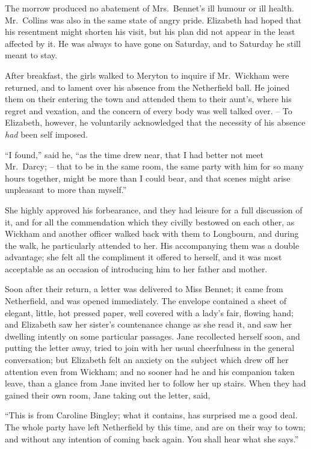 The morrow produced no abatement of Mrs.\ Bennet’s
ill humour or ill health. Mr.\ Collins was also in the
same state of angry pride. Elizabeth had hoped that his
resentment might shorten his visit, but his plan did not
appear in the least affected by it. He was always to have
gone on Saturday, and to Saturday he still meant to stay.

After breakfast, the girls walked to Meryton to inquire
if Mr.\ Wickham were returned, and to lament over his
absence from the Netherfield ball. He joined them on
their entering the town and attended them to their aunt’s,
where his regret and vexation, and the concern of every
body was well talked over. -- To Elizabeth, however, he
voluntarily acknowledged that the necessity of his absence
\textit{had} been self imposed.

“I found,” said he, “as the time drew near, that I had
better not meet Mr.\ Darcy; -- that to be in the same
room, the same party with him for so many hours together,
might be more than I could bear, and that scenes might
arise unpleasant to more than myself.”

She highly approved his forbearance, and they had
leis\-ure for a full discussion of it, and for all the
commendation which they civilly bestowed on each other,
as Wickham and another officer walked back with them
to Longbourn, and during the walk, he particularly
attended to her. His accompanying them was a double
advantage; she felt all the compliment it offered to
herself, and it was most acceptable as an occasion of
introducing him to her father and mother.

Soon after their return, a letter was delivered to Miss
Bennet; it came from Netherfield, and was opened
immediately. The envelope contained a sheet of elegant,
little, hot pressed paper, well covered with a lady’s fair,
flowing hand; and Elizabeth saw her sister’s countenance
change as she read it, and saw her dwelling intently on
some particular passages. Jane recollected herself soon,
and putting the letter away, tried to join with her usual
cheerfulness in the general conversation; but Elizabeth
felt an anxiety on the subject which drew off her attention
even from Wickham; and no sooner had he and his
companion taken leave, than a glance from Jane invited
her to follow her up stairs. When they had gained their
own room, Jane taking out the letter, said,

“This is from Caroline Bingley; what it contains, has
surprised me a good deal. The whole party have left
Netherfield by this time, and are on their way to town;
and without any intention of coming back again. You
shall hear what she says.”

